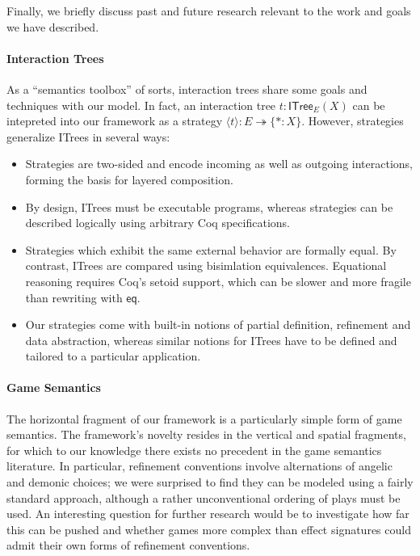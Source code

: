 \documentclass[acmsmall,nonacm]{acmart}
\newcommand{\kw}[1]{\ensuremath{ \mathsf{#1} }}
\begin{document}
Finally, we briefly discuss past and future research
relevant to the work and goals we have described.

\paragraph{Interaction Trees}

As a ``semantics toolbox'' of sorts,
interaction trees share some goals and techniques with our model.
In fact, an interaction tree $t : \kw{ITree}_E(X)$
can be intepreted into our framework as a strategy
$\langle t \rangle : E \twoheadrightarrow \{ {*} : X \}$.
However, strategies generalize ITrees in several ways:
\begin{itemize}
  \item Strategies are two-sided and encode incoming as well as outgoing interactions,
    forming the basis for layered composition.
  \item By design, ITrees must be executable programs,
    whereas strategies can be described logically using arbitrary Coq specifications.
  \item Strategies which exhibit the same external behavior are formally equal.
    By contrast, ITrees are compared using bisimlation equivalences.
    Equational reasoning requires Coq's setoid support,
    which can be slower and more fragile than rewriting with $\kw{eq}$.
  \item Our strategies come with built-in notions of partial definition,
    refinement and data abstraction,
    whereas similar notions for ITrees
    have to be defined and tailored to a particular application.
\end{itemize}

\paragraph{Game Semantics}

The horizontal fragment of our framework is a particularly simple form of game semantics.
The framework's novelty resides in the vertical and spatial fragments,
for which to our knowledge there exists no precedent in the game semantics literature.
In particular, refinement conventions involve alternations of angelic and demonic choices;
we were surprised to find they can be modeled using a fairly standard approach,
although a rather unconventional ordering of plays must be used.
An interesting question for further research would be to investigate how far this can be pushed
and whether games more complex than effect signatures could admit their own forms of refinement conventions.
\end{document}
